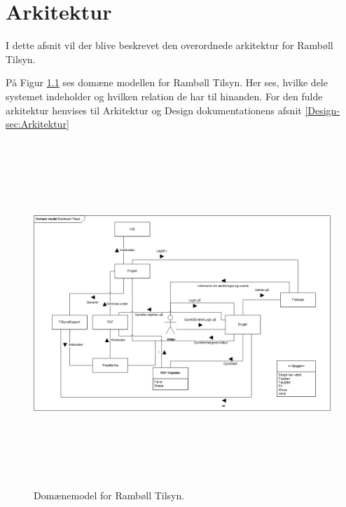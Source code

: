 \chapter{Arkitektur}
I dette afsnit vil der blive beskrevet den overordnede arkitektur for Rambøll Tilsyn.

På Figur \ref{fig:Domain} ses domæne modellen for Rambøll Tilsyn. Her ses, hvilke dele systemet indeholder og hvilken relation de har til hinanden.
For den fulde arkitektur henvises til Arkitektur og Design dokumentationens afsnit \ref{Design-sec:Arkitektur}

\begin{figure}[H] %
	\centering
	\includegraphics[height=13cm, width=17cm]{Arkitektur/Domainmodel}
	\caption{Domænemodel for Rambøll Tilsyn.}
	\label{fig:Domain}
\end{figure}

\clearpage

